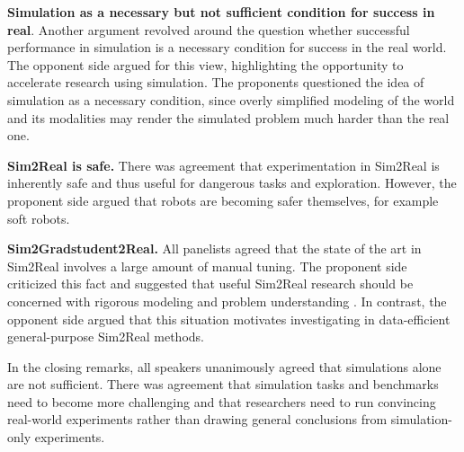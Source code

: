 \textbf{Simulation as a necessary but not sufficient condition for success in real}. Another argument revolved around the question whether successful performance in simulation is a necessary condition for success in the real world. The opponent side argued for this view, highlighting the opportunity to accelerate research using simulation. The proponents questioned the idea of simulation as a necessary condition, since overly simplified modeling of the world and its modalities may render the simulated problem much harder than the real one.

\textbf{Sim2Real is safe.} There was agreement that experimentation in Sim2Real is inherently safe and thus useful for dangerous tasks and exploration. However, the proponent side argued that robots are becoming safer themselves, for example soft robots.

\textbf{Sim2Gradstudent2Real.} All panelists agreed that the state of the art in Sim2Real involves a large amount of manual tuning. The proponent side criticized this fact and suggested that useful Sim2Real research should be concerned with rigorous modeling and problem understanding \cite{hwangbo_learning_2019}. In contrast, the opponent side argued that this situation motivates investigating in data-efficient general-purpose Sim2Real methods.

In the closing remarks, all speakers unanimously agreed that simulations alone are not sufficient. There was agreement that simulation tasks and benchmarks need to become more challenging and that researchers need to run convincing real-world experiments rather than drawing general conclusions from simulation-only experiments.
